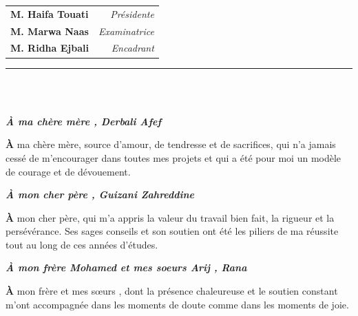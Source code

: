 \documentclass[12pt, oneside, a4paper]{report}
\begin{document}
\begin{titlepage}
\begin{center}
    \noindent
    \fontsize{11pt}{14pt}\selectfont
    \begin{tabular}{@{} p{} r @{}}
        \textbf{\color{blue}M. \quad Haifa Touati} & \textit{Présidente} \\
         \textbf{\color{blue}M. \quad Marwa Naas} & \textit{Examinatrice} \\
        \textbf{\color{blue}M. \quad Ridha Ejbali} & \textit{Encadrant} \\
       
    \end{tabular}

\end{center}
\restoregeometry
\end{titlepage}
\setcounter{page}{1}
\clearpage
\thispagestyle{plain}

\noindent\rule[-0.2cm]{0.45cm}{1.2cm}\hspace{0.15cm}%
\raisebox{0.85cm}{\rule{0.85\textwidth}{0.5pt}}\\[0.3cm]
\noindent{}\\[2cm]

\begin{center}
\textit{\textbf{À ma chère mère , Derbali Afef}}

{\Huge\textbf{À}} ma chère mère, source d'amour, de tendresse et de sacrifices, qui n'a jamais cessé de m'encourager dans toutes mes projets et qui a été pour moi un modèle de courage et de dévouement.

\end{center}
\begin{center}
\textit{\textbf{À mon cher père , Guizani Zahreddine}}

{\Huge\textbf{À}} mon cher père, qui m'a appris la valeur du travail bien fait, la rigueur et la persévérance. Ses sages conseils et son soutien  ont été les piliers de ma réussite tout au long de ces années d'études.


\end{center}

\begin{center}
\textit{\textbf{À mon frère Mohamed et mes  soeurs Arij , Rana }}


{\Huge\textbf{À}} mon frère et mes  sœurs , dont la présence chaleureuse et le soutien constant m'ont accompagnée dans les moments de doute comme dans les moments de joie.


\end{center}
\end{document}
